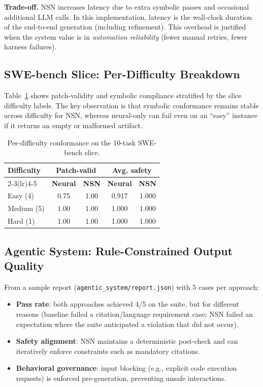\documentclass[conference]{IEEEtran}
\begin{document}
\textbf{Trade-off.} NSN increases latency due to extra symbolic passes and occasional additional LLM calls. In this implementation, latency is the wall-clock duration of the end-to-end generation (including refinement). This overhead is justified when the system value is in \emph{automation reliability} (fewer manual retries, fewer harness failures).

\subsection{SWE-bench Slice: Per-Difficulty Breakdown}
Table~\ref{tab:diffbreakdown} shows patch-validity and symbolic compliance stratified by the slice difficulty labels. The key observation is that symbolic conformance remains stable across difficulty for NSN, whereas neural-only can fail even on an ``easy'' instance if it returns an empty or malformed artifact.

\begin{table}[t]
\centering
\caption{Per-difficulty conformance on the 10-task SWE-bench slice.}
\label{tab:diffbreakdown}
\begin{tabular}{lcccc}
\toprule
\multirow{2}{*}{\textbf{Difficulty}} & \multicolumn{2}{c}{\textbf{Patch-valid}} & \multicolumn{2}{c}{\textbf{Avg. safety}} \\
\cmidrule(lr){2-3}\cmidrule(lr){4-5}
 & \textbf{Neural} & \textbf{NSN} & \textbf{Neural} & \textbf{NSN} \\
\midrule
Easy (4)   & 0.75 & 1.00 & 0.917 & 1.000 \\
Medium (5) & 1.00 & 1.00 & 1.000 & 1.000 \\
Hard (1)   & 1.00 & 1.00 & 1.000 & 1.000 \\
\bottomrule
\end{tabular}
\end{table}

\subsection{Agentic System: Rule-Constrained Output Quality}
From a sample report (\texttt{agentic\_system/report.json}) with 5 cases per approach:
\begin{itemize}
  \item \textbf{Pass rate}: both approaches achieved 4/5 on the suite, but for different reasons (baseline failed a citation/language requirement case; NSN failed an expectation where the suite anticipated a violation that did not occur).
  \item \textbf{Safety alignment}: NSN maintains a deterministic post-check and can iteratively enforce constraints such as mandatory citations.
  \item \textbf{Behavioral governance}: input blocking (e.g., explicit code execution requests) is enforced pre-generation, preventing unsafe interactions.
\end{itemize}
\end{document}
